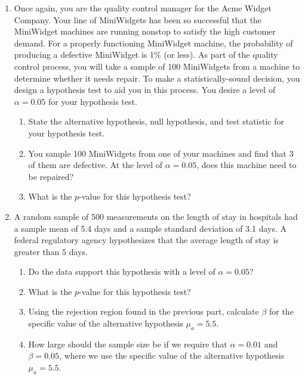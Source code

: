 \documentclass[12pt]{article}
\begin{document}
\begin{enumerate}
\item Once again, you are the quality control manager for the Acme Widget Company. Your line of MiniWidgets has been so successful that the MiniWidget machines are running nonstop to satisfy the high customer demand. For a properly functioning MiniWidget machine, the probability of producing a defective MiniWidget is 1\% (or less). As part of the quality control process, you will take a sample of 100 MiniWidgets from a machine to determine whether it needs repair. To make a statistically-sound decision, you design a hypothesis test to aid you in this process. You desire a level of $\alpha = 0.05$ for your hypothesis test.

\begin{enumerate}
\item State the alternative hypothesis, null hypothesis, and test statistic for your hypothesis test. 
\item You sample 100 MiniWidgets from one of your machines and find that 3 of them are defective. At the level of $\alpha = 0.05$, does this machine need to be repaired?
\item What is the $p$-value for this hypothesis test?
\end{enumerate}

\item A random sample of 500 measurements on the length of stay in hospitals had a sample mean of 5.4 days and a sample standard deviation of 3.1 days. A federal regulatory agency hypothesizes that the average length of stay is greater than 5 days.
\begin{enumerate}
\item Do the data support this hypothesis with a level of $\alpha = 0.05$?
\item What is the $p$-value for this hypothesis test?
\item Using the rejection region found in the previous part, calculate $\beta$ for the specific value of the alternative hypothesis $\mu_a = 5.5$.
\item How large should the sample size be if we require that $\alpha = 0.01$ and $\beta = 0.05$, where we use the specific value of the alternative hypothesis $\mu_a = 5.5$.
\end{enumerate}


\end{enumerate}
\end{document}
